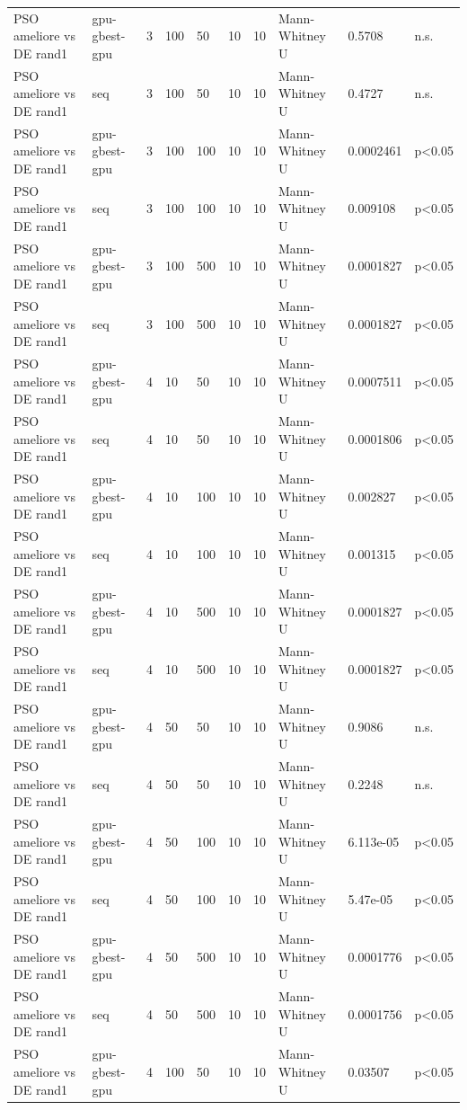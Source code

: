 \begin{table}[t]
\begin{tabular}{llllllllll}
PSO ameliore vs DE rand1 & gpu-gbest-gpu & 3 & 100 & 50 & 10 & 10 & Mann-Whitney U & 0.5708 & n.s. \\
PSO ameliore vs DE rand1 & seq & 3 & 100 & 50 & 10 & 10 & Mann-Whitney U & 0.4727 & n.s. \\
PSO ameliore vs DE rand1 & gpu-gbest-gpu & 3 & 100 & 100 & 10 & 10 & Mann-Whitney U & 0.0002461 & p<0.05 \\
PSO ameliore vs DE rand1 & seq & 3 & 100 & 100 & 10 & 10 & Mann-Whitney U & 0.009108 & p<0.05 \\
PSO ameliore vs DE rand1 & gpu-gbest-gpu & 3 & 100 & 500 & 10 & 10 & Mann-Whitney U & 0.0001827 & p<0.05 \\
PSO ameliore vs DE rand1 & seq & 3 & 100 & 500 & 10 & 10 & Mann-Whitney U & 0.0001827 & p<0.05 \\
PSO ameliore vs DE rand1 & gpu-gbest-gpu & 4 & 10 & 50 & 10 & 10 & Mann-Whitney U & 0.0007511 & p<0.05 \\
PSO ameliore vs DE rand1 & seq & 4 & 10 & 50 & 10 & 10 & Mann-Whitney U & 0.0001806 & p<0.05 \\
PSO ameliore vs DE rand1 & gpu-gbest-gpu & 4 & 10 & 100 & 10 & 10 & Mann-Whitney U & 0.002827 & p<0.05 \\
PSO ameliore vs DE rand1 & seq & 4 & 10 & 100 & 10 & 10 & Mann-Whitney U & 0.001315 & p<0.05 \\
PSO ameliore vs DE rand1 & gpu-gbest-gpu & 4 & 10 & 500 & 10 & 10 & Mann-Whitney U & 0.0001827 & p<0.05 \\
PSO ameliore vs DE rand1 & seq & 4 & 10 & 500 & 10 & 10 & Mann-Whitney U & 0.0001827 & p<0.05 \\
PSO ameliore vs DE rand1 & gpu-gbest-gpu & 4 & 50 & 50 & 10 & 10 & Mann-Whitney U & 0.9086 & n.s. \\
PSO ameliore vs DE rand1 & seq & 4 & 50 & 50 & 10 & 10 & Mann-Whitney U & 0.2248 & n.s. \\
PSO ameliore vs DE rand1 & gpu-gbest-gpu & 4 & 50 & 100 & 10 & 10 & Mann-Whitney U & 6.113e-05 & p<0.05 \\
PSO ameliore vs DE rand1 & seq & 4 & 50 & 100 & 10 & 10 & Mann-Whitney U & 5.47e-05 & p<0.05 \\
PSO ameliore vs DE rand1 & gpu-gbest-gpu & 4 & 50 & 500 & 10 & 10 & Mann-Whitney U & 0.0001776 & p<0.05 \\
PSO ameliore vs DE rand1 & seq & 4 & 50 & 500 & 10 & 10 & Mann-Whitney U & 0.0001756 & p<0.05 \\
PSO ameliore vs DE rand1 & gpu-gbest-gpu & 4 & 100 & 50 & 10 & 10 & Mann-Whitney U & 0.03507 & p<0.05 \\

\end{tabular}
\end{table}
